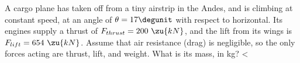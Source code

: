         A cargo plane has taken off from a tiny airstrip in the
        Andes, and is climbing at constant speed, at an angle of
        $\theta=17\degunit$ with respect to horizontal.  Its engines supply a
        thrust of $F_{thrust}=200\ \zu{kN}$, and the lift from its wings is
        $F_{lift}=654\ \zu{kN}$.  Assume that air resistance (drag) is
        negligible, so the only forces acting are thrust, lift, and
        weight.  What is its mass, in kg?
        <%
